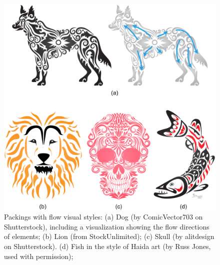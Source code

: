 \begin{figure}[t]
\vspace{-20pt}
\centering
\includegraphics[width=1.0\textwidth]{figures/intro/dog_ornament_flow.pdf} 
\caption[Packings with flow visual styles]
{\label{fig_dog_flow} 
\nnewtext
{
Packings with flow visual styles:}
(a) Dog (by ComicVector703 on Shutterstock), 
including a visualization showing the flow directions of elements; 
(b) Lion (from StockUnlimited);  
(c) Skull (by alitdesign on Shutterstock).
(d) Fish in the style of Haida art (by Russ Jones, used with permission); 
 }
\end{figure}



